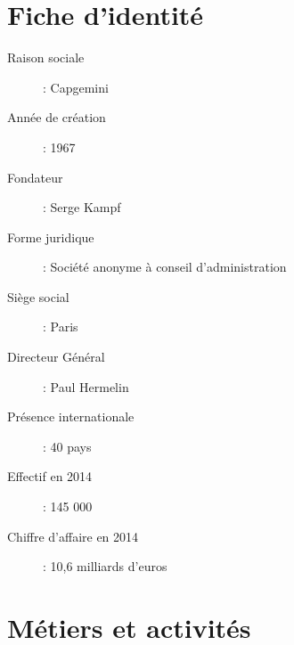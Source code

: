 \section{Fiche d'identité}
\begin{description}
  \item[Raison sociale] : Capgemini
  \item[Année de création] : 1967
  \item[Fondateur] : Serge Kampf
  \item[Forme juridique] : Société anonyme à conseil d'administration
  \item[Siège social] : Paris
  \item[Directeur Général] : Paul Hermelin
  \item[Présence internationale] : 40 pays
  \item[Effectif en 2014] : 145 000
  \item[Chiffre d'affaire en 2014] : 10,6 milliards d'euros
\end{description}
\begin{figure}[h]
\end{figure}
\newpage
\section{Métiers et activités}
